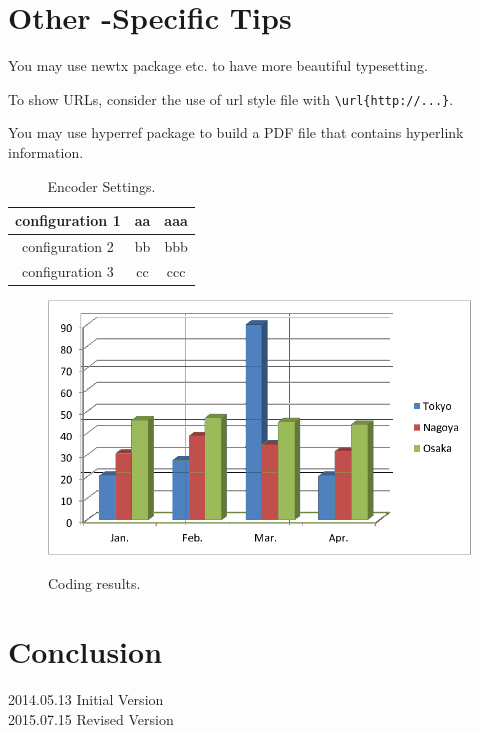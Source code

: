 \documentclass[a4paper,10pt,dvipdfmx,twocolumn,english]{jsarticle}
\begin{document}
\section{Other \LaTeXe-Specific Tips}

You may use newtx\cite{dctspc} package etc. to have more beautiful typesetting.

To show URLs, consider the use of url style file with \verb|\url{http://...}|.

You may use 
hyperref package\cite{hyperref} to 
build a PDF file that contains hyperlink information. 


\begin{table}[tb]
\caption{Encoder Settings.}
\label{tab:settings}
\centering
\begin{tabular}{c||c|c}\hline
 configuration 1 & aa & aaa\\\hline
 configuration 2 & bb & bbb\\\hline
 configuration 3 & cc & ccc\\\hline
\end{tabular}
\end{table}

\begin{figure}[tb]
   \centering
   \includegraphics[width=.55\columnwidth]{figure/sample-e.pdf}\\
   \caption{Coding results.}
   \label{fig:results}
\end{figure}

\vspace{5cm}

\section{Conclusion}
2014.05.13 Initial Version\\
2015.07.15 Revised Version

\def\etal{\textit{et al.}}



\end{document}
